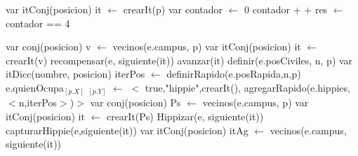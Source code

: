 \begin{algorithm}[H]
\begin{algorithmic}[1]
 
	\State var itConj(posicion) it $\gets$ crearIt(p) 
	\State var contador $\gets$ 0 
		 
		    \State contador $+$ $+$ 
		\EndIf
	\EndWhile
	\State res $\gets$ contador == 4
\EndFunction
\end{algorithmic}
\end{algorithm}
	
\begin{algorithm}[H]
\begin{algorithmic}[1]
 
 
		 
			\State var conj(posicion) v $\gets$ vecinos(e.campus, p) 
			\State var itConj(posicion) it $\gets$ crearIt(v) 
				 
					\State recompensar(e, siguiente(it)) 
				\EndIf
				\State avanzar(it)
			\EndWhile
		\Else
			\State definir(e.posCiviles, n, p)  
			\State var itDicc(nombre, posicion) iterPos $\gets$ definirRapido(e.posRapida,n,p) 
			\State e.quienOcupa$_{[p.X]}$ $_{[p.Y]}$ $\gets$ $<$ true,"hippie",crearIt(), agregarRapido(e.hippies,$<$n,iterPos$>$)$>$ 
			\State var conj(posicion) Ps $\gets$ vecinos(e.campus, p) 
			\State var itConj(posicion) it $\gets$ crearIt(Ps) 
				 
					\State Hippizar(e, siguiente(it)) 
					 
						\State capturarHippie(e,siguiente(it)) 
					\EndIf
				\Else
					 
						\State var itConj(posicion) itAg $\gets$ vecinos(e.campus, siguiente(it)) 
						  

\end{algorithmic}
\end{algorithm}
